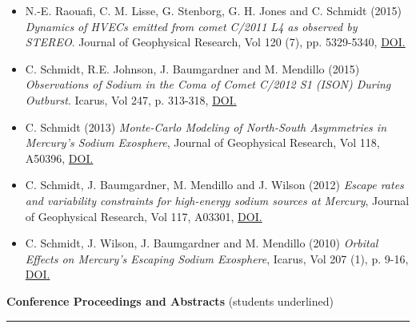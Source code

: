 \documentclass[12pt]{report}
\begin{document}
\begin{itemize}
  \item N.-E. Raouafi, C. M. Lisse, G. Stenborg, G. H. Jones and C. Schmidt (2015) \textit{Dynamics of HVECs emitted from comet C/2011 L4 as observed by STEREO}. Journal of Geophysical Research, Vol 120 (7), pp. 5329-5340, \href{https://doi.org/10.1002/2014JA020926}{DOI.}
  \item C. Schmidt, R.E. Johnson, J. Baumgardner and M. Mendillo (2015) \textit{Observations of Sodium in the Coma of Comet C/2012 S1 (ISON) During Outburst}. Icarus, Vol 247, p. 313-318, \href{https://doi.org/10.1016/j.icarus.2014.10.022}{DOI.}
  \item C. Schmidt (2013) \textit{Monte-Carlo Modeling of North-South Asymmetries in Mercury's Sodium Exosphere}, Journal of Geophysical Research, Vol 118, A50396, \href{https://doi.org/10.1002/jgra.50396}{DOI.}
  \item C. Schmidt, J. Baumgardner, M. Mendillo and J. Wilson (2012) \textit{Escape rates and variability constraints for high-energy sodium sources at Mercury}, Journal of Geophysical Research, Vol 117, A03301, \href{https://doi.org/10.1029/2011JA017217}{DOI.}
  \item C. Schmidt, J. Wilson, J. Baumgardner and M. Mendillo (2010) \textit{Orbital Effects on Mercury's Escaping Sodium Exosphere}, Icarus, Vol 207 (1), p. 9-16, \href{https://doi.org/10.1016/j.icarus.2009.10.017}{DOI.}
 \end{itemize}
\vspace{2 mm}
\noindent\textbf{Conference Proceedings and Abstracts} (students underlined) \rm\hspace*{\fill} \\
\rule{\textwidth}{1pt}
\end{document}
